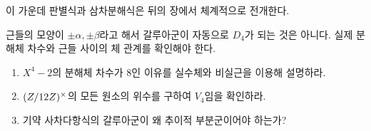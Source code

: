 이 가운데 판별식과 삼차분해식은 뒤의 장에서 체계적으로 전개한다.

\begin{pitfall}
근들의 모양이 $\pm\alpha,\pm\beta$라고 해서 갈루아군이 자동으로 $D_4$가 되는 것은 아니다. 실제 분해체 차수와 근들 사이의 체 관계를 확인해야 한다.
\end{pitfall}

\begin{checkpoint}
\begin{enumerate}[label=(\alph*)]
  \item $X^4-2$의 분해체 차수가 $8$인 이유를 실수체와 비실근을 이용해 설명하라.
  \item $(Z/12Z)^\times$의 모든 원소의 위수를 구하여 $V_4$임을 확인하라.
  \item 기약 사차다항식의 갈루아군이 왜 추이적 부분군이어야 하는가?
\end{enumerate}
\end{checkpoint}

